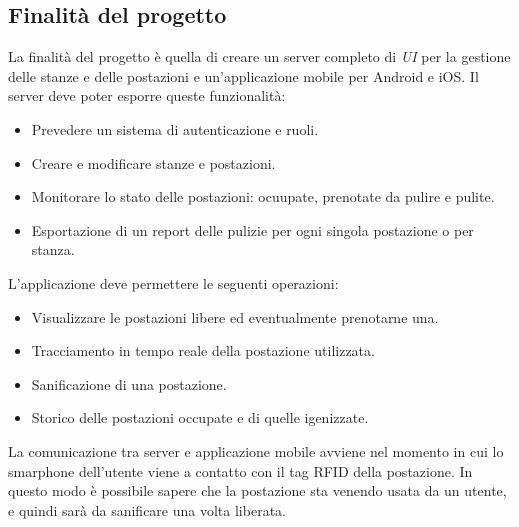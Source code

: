 \subsection{Finalità del progetto}
La finalità del progetto è quella di creare un server completo di \textit{UI} per la gestione delle stanze e delle postazioni e un'applicazione mobile per Android e iOS.
Il server deve poter esporre queste funzionalità:
\begin{itemize}
    \item Prevedere un sistema di autenticazione e ruoli.
    \item Creare e modificare stanze e postazioni.
    \item Monitorare lo stato delle postazioni: ocuupate, prenotate da pulire e pulite.
    \item Esportazione di un report delle pulizie per ogni singola postazione o per stanza.
\end{itemize}
L'applicazione deve permettere le seguenti operazioni:
\begin{itemize}
    \item Visualizzare le postazioni libere ed eventualmente prenotarne una.
    \item Tracciamento in tempo reale della postazione utilizzata.
    \item Sanificazione di una postazione.
    \item Storico delle postazioni occupate e di quelle igenizzate.
\end{itemize}
La comunicazione tra server e applicazione mobile avviene nel momento in cui lo smarphone dell'utente viene a contatto con il tag RFID della postazione.
In questo modo è possibile sapere che la postazione sta venendo usata da un utente, e quindi sarà da sanificare una volta liberata.

